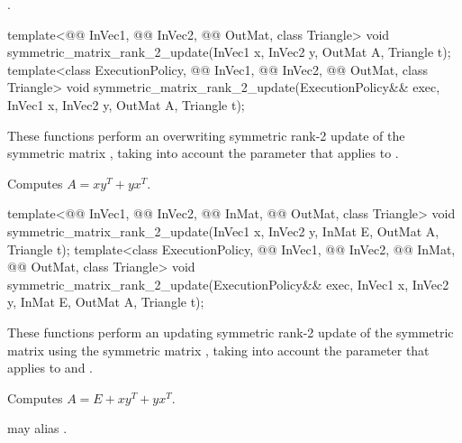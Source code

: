 \pnum
\complexity
{}.

%
\begin{itemdecl}
template<@@ InVec1, @@ InVec2,
         @@ OutMat, class Triangle>
  void symmetric_matrix_rank_2_update(InVec1 x, InVec2 y, OutMat A, Triangle t);
template<class ExecutionPolicy, @@ InVec1, @@ InVec2,
         @@ OutMat, class Triangle>
  void symmetric_matrix_rank_2_update(ExecutionPolicy&& exec,
                                      InVec1 x, InVec2 y, OutMat A, Triangle t);
\end{itemdecl}

\begin{itemdescr}
\pnum
These functions perform
an overwriting symmetric rank-2 update of the symmetric matrix ,
taking into account the  parameter
that applies to .

\pnum
\effects
Computes $A = x y^T + y x^T$.
\end{itemdescr}

%
\begin{itemdecl}
template<@@ InVec1, @@ InVec2, @@ InMat,
         @@ OutMat, class Triangle>
  void symmetric_matrix_rank_2_update(InVec1 x, InVec2 y, InMat E, OutMat A, Triangle t);
template<class ExecutionPolicy, @@ InVec1, @@ InVec2, @@ InMat,
         @@ OutMat, class Triangle>
  void symmetric_matrix_rank_2_update(ExecutionPolicy&& exec,
                                      InVec1 x, InVec2 y, InMat E, OutMat A, Triangle t);
\end{itemdecl}

\begin{itemdescr}
\pnum
These functions perform
an updating symmetric rank-2 update of the symmetric matrix 
using the symmetric matrix ,
taking into account the  parameter
that applies to  and .

\pnum
\effects
Computes $A = E + x y^T + y x^T$.

\pnum
\remarks
{} may alias .
\end{itemdescr}

